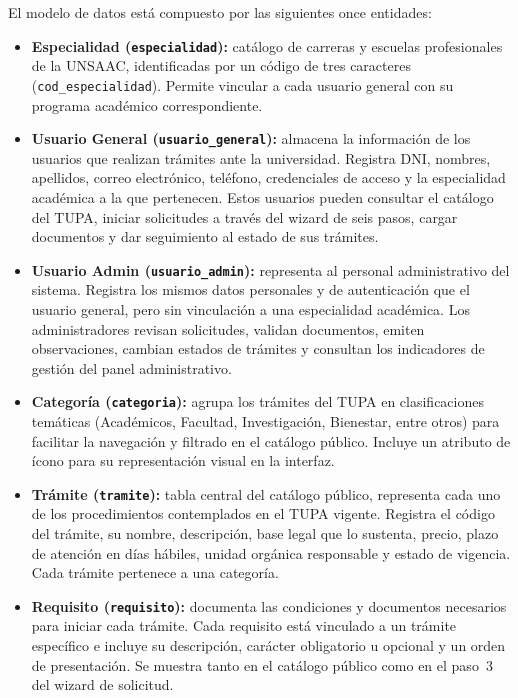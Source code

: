 El modelo de datos está compuesto por las siguientes once entidades:

\begin{itemize}
  \item \textbf{Especialidad (\texttt{especialidad}):} catálogo de carreras y escuelas
        profesionales de la UNSAAC, identificadas por un código de tres caracteres
        (\texttt{cod\_especialidad}). Permite vincular a cada usuario general con su
        programa académico correspondiente.

  \item \textbf{Usuario General (\texttt{usuario\_general}):} almacena la información
        de los usuarios que realizan trámites ante la universidad. Registra DNI, nombres,
        apellidos, correo electrónico, teléfono, credenciales de acceso y la especialidad
        académica a la que pertenecen. Estos usuarios pueden consultar el catálogo del
        TUPA, iniciar solicitudes a través del wizard de seis pasos, cargar documentos y
        dar seguimiento al estado de sus trámites.

  \item \textbf{Usuario Admin (\texttt{usuario\_admin}):} representa al personal
        administrativo del sistema. Registra los mismos datos personales y de
        autenticación que el usuario general, pero sin vinculación a una especialidad
        académica. Los administradores revisan solicitudes, validan documentos, emiten
        observaciones, cambian estados de trámites y consultan los indicadores de gestión
        del panel administrativo.

  \item \textbf{Categoría (\texttt{categoria}):} agrupa los trámites del TUPA en
        clasificaciones temáticas (Académicos, Facultad, Investigación, Bienestar,
        entre otros) para facilitar la navegación y filtrado en el catálogo público.
        Incluye un atributo de ícono para su representación visual en la interfaz.

  \item \textbf{Trámite (\texttt{tramite}):} tabla central del catálogo público,
        representa cada uno de los procedimientos contemplados en el TUPA vigente.
        Registra el código del trámite, su nombre, descripción, base legal que lo
        sustenta, precio, plazo de atención en días hábiles, unidad orgánica responsable
        y estado de vigencia. Cada trámite pertenece a una categoría.

  \item \textbf{Requisito (\texttt{requisito}):} documenta las condiciones y documentos
        necesarios para iniciar cada trámite. Cada requisito está vinculado a un trámite
        específico e incluye su descripción, carácter obligatorio u opcional y un orden
        de presentación. Se muestra tanto en el catálogo público como en el paso~3 del
        wizard de solicitud.


\end{itemize}
